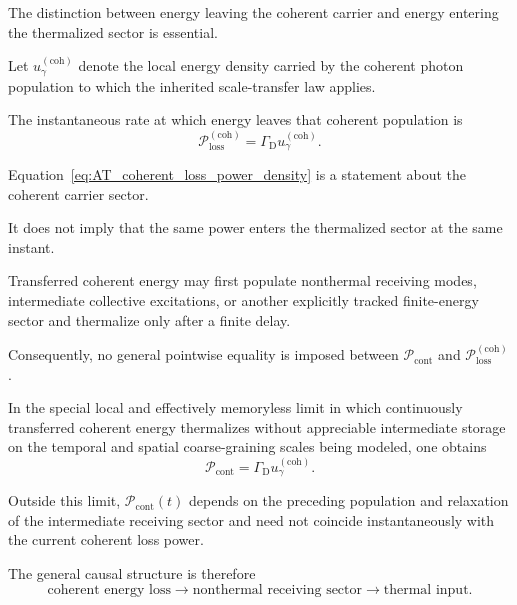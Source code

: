 The distinction between energy leaving the coherent carrier and energy
entering the thermalized sector is essential.

Let
\(u_\gamma^{(\mathrm{coh})}\)
denote the local energy density carried by the coherent photon population to
which the inherited scale-transfer law applies.

The instantaneous rate at which energy leaves that coherent population is
\begin{equation}
    \mathcal P_{\mathrm{loss}}^{(\mathrm{coh})}
    =
    \Gamma_{\mathrm D}
    u_\gamma^{(\mathrm{coh})}.
    \label{eq:AT_coherent_loss_power_density}
\end{equation}

Equation~\eqref{eq:AT_coherent_loss_power_density}
is a statement about the coherent carrier sector.

It does not imply that the same power enters the thermalized sector at the
same instant.

Transferred coherent energy may first populate nonthermal receiving modes,
intermediate collective excitations, or another explicitly tracked
finite-energy sector and thermalize only after a finite delay.

Consequently, no general pointwise equality is imposed between
\(\mathcal P_{\mathrm{cont}}\)
and
\(\mathcal P_{\mathrm{loss}}^{(\mathrm{coh})}\).

In the special local and effectively memoryless limit in which continuously
transferred coherent energy thermalizes without appreciable intermediate
storage on the temporal and spatial coarse-graining scales being modeled,
one obtains
\begin{equation}
    \mathcal P_{\mathrm{cont}}
    =
    \Gamma_{\mathrm D}
    u_\gamma^{(\mathrm{coh})}.
    \label{eq:AT_complete_continuous_thermalization}
\end{equation}

Outside this limit,
\(\mathcal P_{\mathrm{cont}}(t)\)
depends on the preceding population and relaxation of the intermediate
receiving sector and need not coincide instantaneously with the current
coherent loss power.

The general causal structure is therefore
\begin{equation}
    \text{coherent energy loss}
    \longrightarrow
    \text{nonthermal receiving sector}
    \longrightarrow
    \text{thermal input}.
    \label{eq:AT_coherent_to_thermal_sequence}
\end{equation}

